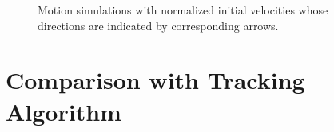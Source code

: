 \begin{figure}[H]
  \centering
  \quad
  \caption{Motion simulations with normalized initial velocities whose directions are indicated by corresponding arrows.}\label{fig:N_pos}
\end{figure}

\section{Comparison with Tracking Algorithm}\label{tracking}

